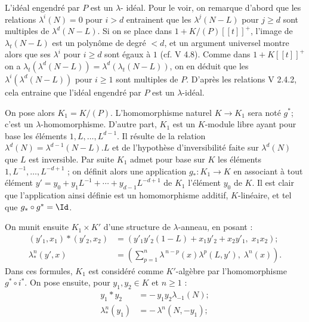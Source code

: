L'idéal engendré par \(P\) est un \(\lambda\)-
idéal. Pour le voir, on remarque d'abord que les relations \(\lambda^i(N)=0\) pour \(i>d\) entrainent que les \(\lambda^j(N-L)\) pour \(j\ge d\) sont multiples de \(\lambda^d(N-L)\). Si on se place dans \(1+K/(P)[[t]]^+\), l'image de \(\lambda_t(N-L)\) est un polynôme de degré \(<d\), et un argument universel montre alors que ses \(\lambda^i\) pour \(i\ge d\) sont égaux à \(1\) (cf. V 4.8). Comme dans \(1+K[[t]]^+\) on a \(\lambda_t(\lambda^d(N-L))=\lambda^d(\lambda_t(N-L))\), on en déduit que les \(\lambda^i(\lambda^d(N-L))\) pour \(i\ge1\) sont multiples de \(P\). D'après les relations V 2.4.2, cela entraine que l'idéal engendré par \(P\) est un \(\lambda\)-idéal.

On pose alors \(K_1=K/(P)\). L'homomorphisme naturel \(K\to K_1\) sera noté \(g^*\); c'est un \(\lambda\)-homomorphisme. D'autre part, \(K_1\) est un \(K\)-module libre ayant pour base les éléments \(1,L,\ldots,L^{d-1}\). Il résulte de la relation \(\lambda^d(N)=\lambda^{d-1}(N-L).L\) et de l'hypothèse d'inversibilité faite sur \(\lambda^d(N)\) que \(L\) est inversible. Par suite \(K_1\) admet pour base sur \(K\) les éléments \(1,L^{-1},\ldots,L^{-d+1}\) ; on définit alors une application \(g_*:K_1\to K\) en associant à tout élément \(y'=y_0+y_1L^{-1}+\cdots+y_{d-1}L^{-d+1}\) de \(K_1\) l'élément \(y_0\) de \(K\). Il est clair que l'application ainsi définie est un homomorphisme additif, \(K\)-linéaire, et tel que \(g_*\circ g^*=\Id\).

On munit ensuite \(K_1\times K'\) d'une structure de \(\lambda\)-anneau, en posant :
\begin{align}
 (y'_1,x_1)*(y'_2,x_2)
   &=(y'_1y'_2(1-L)+x_1y'_2+x_2y'_1,\; x_1x_2); \tag{4.7.1}\\
 \lambda^n_*(y',x)
   &=\left(\sum_{p=1}^{n}\lambda^{\,n-p}(x)\lambda^p(L,y'),\;
     \lambda^n(x)\right). \tag{4.7.2}
\end{align}
Dans ces formules, \(K_1\) est considéré comme \(K'\)-algèbre par l'homomorphisme \(g^*\circ i^*\).
On pose ensuite, pour \(y_1,y_2\in K\) et \(n\ge1\) :
\begin{align}
 y_1*y_2&=-\,y_1y_2\lambda_{-1}(N); \tag{4.7.3}\\
 \lambda^n_*(y_1)&=-\,\lambda^n(N,-y_1); \tag{4.7.4}
\end{align}
